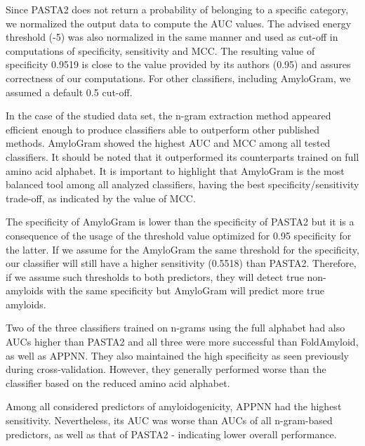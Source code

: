 \documentclass[fleqn,10pt,twoside]{gcb15submission}
\begin{document}
  Since PASTA2 does not return a probability of belonging to a specific 
category, we normalized the output data to compute the AUC values. The advised 
energy threshold (-5) was also normalized in the same manner and used as cut-off 
in computations of specificity, sensitivity and MCC. The resulting value of 
specificity 0.9519 is close to the value provided by its authors (0.95) and 
assures correctness of our computations. For other classifiers, including 
AmyloGram, we assumed a default 0.5 cut-off.
    
  In the case of the studied data set, the n-gram extraction method appeared 
efficient enough to produce classifiers able to outperform other published 
methods. AmyloGram showed the highest AUC and MCC among all tested classifiers. 
It should be noted that it outperformed its counterparts trained on full amino 
acid alphabet. It is important to highlight that AmyloGram is the most balanced 
tool among all analyzed classifiers, having the best specificity/sensitivity 
trade-off, as indicated by the value of MCC.
 
  The specificity of AmyloGram is lower than the specificity of PASTA2 but it is 
a consequence of the usage of the threshold value optimized for 0.95 specificity 
for the latter. If we assume for the AmyloGram the same threshold for the 
specificity, our classifier will still have a higher sensitivity (0.5518) than 
PASTA2. Therefore, if we assume such thresholds to both predictors, they will 
detect true non-amyloids with the same specificity but AmyloGram will predict 
more true amyloids. 

  Two of  the three classifiers trained on  n-grams using  the full alphabet 
had also AUCs higher than PASTA2 and all three were more successful than 
FoldAmyloid, as well as APPNN. They also maintained the high specificity as seen 
previously during cross-validation. However, they generally performed worse than 
the classifier based on the reduced amino acid alphabet.
  
  Among all considered predictors of amyloidogenicity, APPNN had the highest 
sensitivity. Nevertheless, its AUC was worse than AUCs of all n-gram-based 
predictors, as well as that of PASTA2  - indicating lower overall performance.

\end{document}
